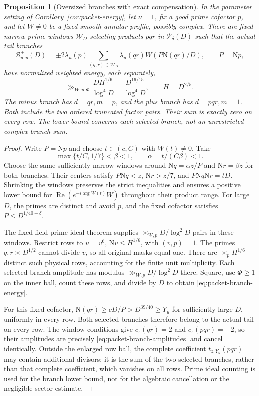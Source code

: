 \documentclass[11pt]{article}
\numberwithin{equation}{section}
\newtheorem{proposition}[theorem]{Proposition}
\theoremstyle{definition}
\theoremstyle{remark}
\newcommand{\N}{\mathrm N}
\newcommand{\Rea}{\operatorname{Re}}
\begin{document}
\begin{proposition}[Oversized branches with exact compensation]
\label{prop:packet-branches}
In the parameter setting of Corollary~\ref{cor:packet-energy}, let
$\nu=1$, fix a good prime cofactor $p$, and let $W\ne0$ be
a fixed smooth annular profile, possibly complex. There are fixed
narrow prime windows $\mathcal W_D$ selecting products $pqr$ in
$\mathcal P_\delta(D)$ such that the actual tail branches
\begin{equation}\label{eq:packet-branch-amplitudes}
 \mathcal B^\pm_{u,p}(D)=\pm2\lambda_u(p)
 \sum_{(q,r)\in\mathcal W_D}
 \lambda_u(qr)W(P\N(qr)/D),\qquad P=\N p,
\end{equation}
have normalized weighted energy, each separately,
\begin{equation}\label{eq:packet-branch-energy}
 \gg_{W,p,\Phi}\frac{DH^{1/6}}{\log^4D}
 =\frac{D^{16/15}}{\log^4D},\qquad H=D^{2/5}.
\end{equation}
The minus branch has $d=qr,m=p$, and the plus branch has
$d=pqr,m=1$. Both include the two ordered truncated factor pairs.
Their sum is exactly zero on every row. The lower bound concerns each
selected branch, not an unrestricted complex branch sum.
\end{proposition}

\begin{proof}
Write $P=\N p$ and choose $t\in(c,C)$ with $W(t)\ne0$.
Take
\[
 \max\{t/C,1/7\}<\beta<1,\qquad
 \alpha=t/(C\beta)<1.
\]
Choose the same sufficiently narrow windows around
$\N q=\alpha z/P$ and $\N r=\beta z$ for both branches.
Their centers satisfy $P\N q<z$, $\N r>z/7$, and
$P\N q\N r=tD$. Shrinking the windows preserves the strict
inequalities and ensures a positive lower bound for
$\Rea(e^{-i\arg W(t)}W)$ throughout their product range.
For large $D$, the primes are distinct and avoid $p$, and the fixed
cofactor satisfies $P\le D^{1/40-\delta}$.

The fixed-field prime ideal theorem supplies
$\asymp_{W,p}D/\log^2D$ pairs in these windows. Restrict rows
to $u=v^6$, $\N v\le H^{1/6}$, with $(v,p)=1$.
The primes $q,r\asymp D^{1/2}$ cannot divide $v$, so all original
masks equal one. There are $\asymp_p H^{1/6}$ distinct such
physical rows, accounting for the finite unit multiplicity.
Each selected branch amplitude has modulus
$\gg_{W,p}D/\log^2D$ there. Square, use $\Phi\ge1$ on the
inner ball, count these rows, and divide by $D$ to obtain
\eqref{eq:packet-branch-energy}.

For this fixed cofactor, $\N(qr)\ge cD/P>D^{39/40}\ge Y_u$
for sufficiently large $D$, uniformly in every row. Both selected
branches therefore belong to the actual tail on every row.
The window conditions give $c_z(qr)=2$ and $c_z(pqr)=-2$,
so their amplitudes are precisely \eqref{eq:packet-branch-amplitudes}
and cancel identically. Outside the enlarged row ball, the complete
coefficient $t_{z,Y_u}(pqr)$ may contain additional divisors; it is
the sum of the two selected branches, rather than that complete
coefficient, which vanishes on all rows. Prime ideal counting is
used for the branch lower bound, not for the algebraic cancellation
or the negligible-sector estimate.
\end{proof}
\end{document}
